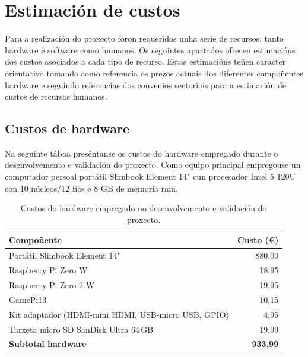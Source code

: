 \section{Estimación de custos}
Para a realización do proxecto foron requeridos unha serie de recursos,
tanto hardware e software como humanos.
Os seguintes apartados ofrecen estimacións dos custos asociados a cada tipo de recurso.
Estas estimacións teñen caracter orientativo tomando como referencia os prezos actuais
dos diferentes compoñentes hardware e seguindo referencias dos convenios sectoriais
para a estimación de custos de recursos humanos.

\subsection{Custos de hardware}
Na seguinte táboa preséntanse os custos do hardware empregado durante o desenvolvemento
e validación do proxecto. Como equipo principal empregouse un computador persoal portátil
Slimbook Element 14" cun procesador Intel 5 120U con 10 núcleos/12 fíos e 8 GB de memoria \acrshort{ram}.


\begin{table}[htbp]
  \centering
  \begin{tabular}{l|r}
  \rowcolor{udcpink!25}
  \textbf{Compoñente} & \textbf{Custo (€)} \\\hline          %
  Portátil Slimbook Element 14"                           & 880,00 \\
  Raspberry Pi Zero W                                     & 18,95 \\
  Raspberry Pi Zero 2 W                                   & 19,95 \\
  GamePi13                                                & 10,15 \\
  Kit adaptador (HDMI-mini HDMI, USB-micro USB, GPIO)   & 4,95 \\
  Tarxeta micro SD SanDisk Ultra 64\,GB                   & 19,99 \\\hline
  \rowcolor{udcpink!25}
  \textbf{Subtotal hardware}                                          & \textbf{933,99} \\
  \end{tabular}
  \caption{Custos do hardware empregado no desenvolvemento e validación do proxecto.}
  \label{tab:custos-hardware}
\end{table}

\vspace{1em}
